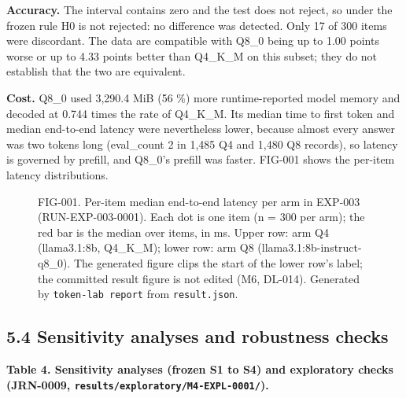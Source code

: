 \documentclass[
]{article}
\makeatletter
\newcommand*\pandocbounded[1]{%
  \sbox\pandoc@box{#1}%
  \Gscale@div\@tempa{\textheight}{\dimexpr\ht\pandoc@box+\dp\pandoc@box\relax}%
  \Gscale@div\@tempb{\linewidth}{\wd\pandoc@box}%
  \ifdim\@tempb\p@<\@tempa\p@\let\@tempa\@tempb\fi%
  \ifdim\@tempa\p@<\p@\scalebox{\@tempa}{\usebox\pandoc@box}%
  \else\usebox{\pandoc@box}%
  \fi%
}
\makeatother
\begin{document}
\textbf{Accuracy.} The interval contains zero and the test does not
reject, so under the frozen rule H0 is not rejected: no difference was
detected. Only 17 of 300 items were discordant. The data are compatible
with Q8\_0 being up to 1.00 points worse or up to 4.33 points better
than Q4\_K\_M on this subset; they do not establish that the two are
equivalent.

\textbf{Cost.} Q8\_0 used 3,290.4 MiB (56 \%) more runtime-reported
model memory and decoded at 0.744 times the rate of Q4\_K\_M. Its median
time to first token and median end-to-end latency were nevertheless
lower, because almost every answer was two tokens long (eval\_count 2 in
1,485 Q4 and 1,480 Q8 records), so latency is governed by prefill, and
Q8\_0's prefill was faster. FIG-001 shows the per-item latency
distributions.

\begin{figure}
\centering
\pandocbounded{}
\caption{FIG-001. Per-item median end-to-end latency per arm in EXP-003
(RUN-EXP-003-0001). Each dot is one item (n = 300 per arm); the red bar
is the median over items, in ms. Upper row: arm Q4 (llama3.1:8b,
Q4\_K\_M); lower row: arm Q8 (llama3.1:8b-instruct-q8\_0). The generated
figure clips the start of the lower row's label; the committed result
figure is not edited (M6, DL-014). Generated by
\texttt{token-lab\ report} from \texttt{result.json}.}
\end{figure}

\subsection{5.4 Sensitivity analyses and robustness
checks}\label{sensitivity-analyses-and-robustness-checks}

\textbf{Table 4. Sensitivity analyses (frozen S1 to S4) and exploratory
checks (JRN-0009, \texttt{results/exploratory/M4-EXPL-0001/}).}
\end{document}
